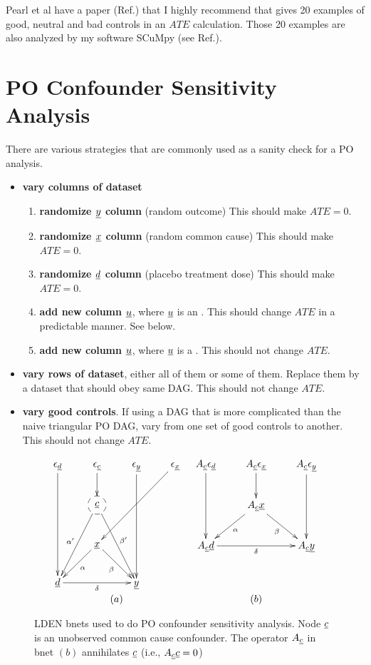 Pearl et al have a paper
(Ref.\cite{pearl-good-neutral-bad})
that I highly recommend
that gives 20 examples
of good, neutral and
bad controls
in an $ATE$ calculation.
Those 20 examples are also analyzed
by my software SCuMpy (see Ref.\cite{scumpy}).

\section{PO Confounder Sensitivity Analysis}
\label{intro-pot-out-sensitivity}

There are various  strategies that are commonly
used 
as a sanity check for a
PO analysis.
\begin{itemize}
\item {\bf vary columns of dataset}
\begin{enumerate}
\item {\bf randomize $\rvy$ column} (random outcome) This should make $ATE=0$.
\item {\bf randomize $\rvx$ column}
(random common cause) This should make $ATE=0$.
\item {\bf randomize $\rvd$ column} (placebo treatment dose) This should make $ATE=0$.
\item {\bf add new column $\rvu$}, where $\rvu$ is an .
This should change $ATE$ 
in a predictable manner. See below.
\item {\bf add new column $\rvu$}, where $\rvu$ is a .
This should not change $ATE$.
\end{enumerate}
\item {\bf vary rows of dataset},
either all of them or some of them.
Replace them by a dataset that 
should obey same DAG.
This should not change $ATE$.
\item {\bf vary good controls}. If using
a DAG that is more complicated than the
naive triangular PO DAG,
vary from one set of good
controls to another.
This should not change $ATE$.

\end{itemize}


\begin{figure}[h!]
$$
\begin{array}{cc}
\xymatrix{
\eps_\rvd\ar[ddd]
&\eps_\rvc\ar[d]
&\eps_\rvy\ar[ddd]
&\eps_\rvx\ar[lldd]
\\
&*++[F-o]{\rvc}\ar[ldd]_{\alp'}
\ar[rdd]^{\beta'}
\\
&\rvx
\ar[ld]^\alp
\ar[rd]_\beta
\\
\rvd\ar[rr]_\delta
&&\rvy
}
&
\xymatrix{
A_\rvc\eps_\rvd\ar[dd]
&A_\rvc\eps_\rvx\ar[d]
&A_\rvc\eps_\rvy\ar[dd]
\\
&A_\rvc\rvx
\ar[ld]^\alp
\ar[rd]_\beta
\\
A_\rvc\rvd\ar[rr]_\delta
&&A_\rvc\rvy
}
\\
(a)&(b)
\end{array}
$$
\caption{LDEN bnets used to do PO confounder
sensitivity analysis.
Node $\rvc$
is an unobserved common cause confounder. 
The operator $A_\rvc$ in bnet $(b)$ annihilates $\rvc$ (i.e., $A_\rvc \rvc =0$)}
\label{eq-po-sen-ana}
\end{figure}

